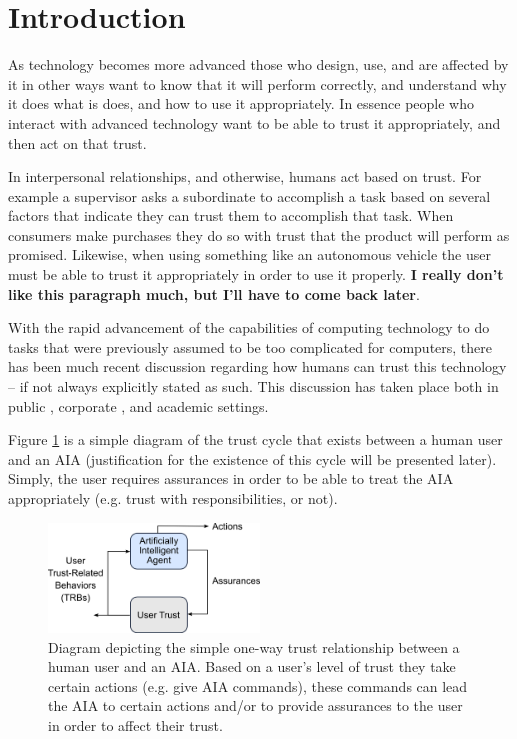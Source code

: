 \section{Introduction}
    As technology becomes more advanced those who design, use, and are affected by it in other ways want to know that it will perform correctly, and understand why it does what is does, and how to use it appropriately. In essence people who interact with advanced technology want to be able to trust it appropriately, and then act on that trust.

    In interpersonal relationships, and otherwise, humans act based on trust. For example a supervisor asks a subordinate to accomplish a task based on several factors that indicate they can trust them to accomplish that task. When consumers make purchases they do so with trust that the product will perform as promised. Likewise, when using something like an autonomous vehicle the user must be able to trust it appropriately in order to use it properly. \textbf{I really don't like this paragraph much, but I'll have to come back later}.

    With the rapid advancement of the capabilities of computing technology to do tasks that were previously assumed to be too complicated for computers, there has been much recent discussion regarding how humans can trust this technology -- if not always explicitly stated as such. This discussion has taken place both in public \cite{Spectrum2016-jv,DeSteno2014-cq,Cranz2017-yh,Cassel2017-tn,Danks_undated-sb}, corporate \cite{Banavar2016-nm, Khosravi2016-ke,Moody2017-vd,Rudnitsky2017-in,Benioff2016-tc}, and academic \cite{Lloyd_undated-bb,Goodrum_2016-fm,Foley2017-qj,Ghahramani2015-yq,Castelvecchi2016-mr} settings.

    Figure \ref{fig:SimpleTrust_one_way} is a simple diagram of the trust cycle that exists between a human user and an AIA (justification for the existence of this cycle will be presented later). Simply, the user requires assurances in order to be able to treat the AIA appropriately (e.g. trust with responsibilities, or not).

    \begin{figure}
        \centering
        \includegraphics[width=0.5\textwidth]{Figures/SimpleTrust_one_way.png}
        \caption{Diagram depicting the simple one-way trust relationship between a human user and an AIA. Based on a user's level of trust they take certain actions (e.g. give AIA commands), these commands can lead the AIA to certain actions and/or to provide assurances to the user in order to affect their trust.}
        \label{fig:SimpleTrust_one_way}
    \end{figure}

